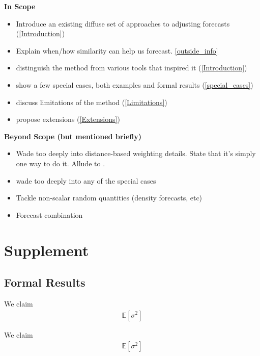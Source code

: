 \documentclass[11pt]{article}
\theoremstyle{definition}
\newenvironment{proof-of-proposition}[1][{}]{\noindent{\bf
    Proof of Proposition {#1}}
  \hspace*{.5em}}{\qed\bigskip\\}
\begin{document}
\textbf{In Scope}
\begin{itemize}
  \item Introduce an existing diffuse set of approaches to adjusting forecasts (\ref{Introduction})
  \item Explain when/how similarity can help us forecast. \ref{outside_info}
  \item distinguish the method from various tools that inspired it (\ref{Introduction})
  \item show a few special cases, both examples and formal results (\ref{special_cases})
  \item discuss limitations of the method (\ref{Limitations})
  \item propose extensions (\ref{Extensions})
\end{itemize}
\textbf{Beyond Scope (but mentioned briefly)}
\begin{itemize}
  \item Wade too deeply into distance-based weighting details.  State that it's simply one way to do it.  Allude to \cite{lin2021minimizing,lundquist2024volatility}.
  \item wade too deeply into any of the special cases
  \item Tackle non-scalar random quantities (density forecasts, etc)
  \item Forecast combination
\end{itemize}

\section{Supplement}


\subsection{Formal Results}

\begin{proof-of-proposition}[\ref{ARIMA_param_consistency}]
  We claim
  \begin{align}
  \mathbb{E}[ \sigma^{2} ]
  \end{align}
  
  \end{proof-of-proposition}

  \begin{proof-of-proposition}[\ref{ARIMA_conv_distribution}]
    We claim
    \begin{align}
    \mathbb{E}[ \sigma^{2} ]
    \end{align}
    
    \end{proof-of-proposition}
  
\clearpage


 
\end{document}

